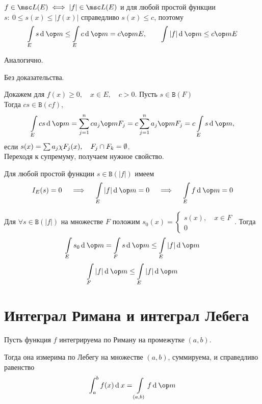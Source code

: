 \begin{eproof}
	\item $ f \in \msc L(E) \iff |f| \in \msc L(E) $ и для любой простой функции $ s : ~ 0 \le s(x) \le |f(x)| $ справедливо $ s(x) \le c $, поэтому
	$$ \int\limits_E s \di \op m \le \int\limits_E c \di \op m = c \op m E, \qquad \int |f| \di \op m \le c \op m E $$

	\item Аналогично.

	\item Без доказательства.

	\item Докажем для $ f(x) \ge 0, \quad x \in E, \quad c > 0 $.
		Пусть $ s \in \mathtt B(F) $ \\
	Тогда $ cs \in \mathtt B(cf) $,
	$$ \int\limits_{E} cs \di \op m = \sum_{j = 1}^n ca_j \op m F_j = c \sum_{j = 1}^n a_j \op m F_j = c \int\limits_E s \di \op m, $$
	если $ s(x) = \sum a_j \chi{F_j}(x), \quad F_j \cap F_k = \emptyset $. \\
	Переходя к супремуму, получаем нужное свойство.

	\item Для любой простой функции $ s \in \mathtt B(|f|) $ имеем
		$$ I_E(s) = 0 \quad \implies \quad \int\limits_E |f| \di \op m = 0 \quad \implies \quad \int\limits_E f \di \op m = 0 $$

	\item Для $ \forall s \in \mathtt B(|f|) $ на множестве $ F $ положим $ s_0(x) =
		\begin{cases}
			s(x), \quad x \in F \\
			0
		\end{cases} $. Тогда
		$$ \int\limits_E s_0 \di \op m = \int\limits_F s \di \op m \le \int \limits_E |f| \di \op m $$
		$$ \int\limits_F |f| \di \op m \le \int\limits_E |f| \di \op m $$
\end{eproof}

\section{Интеграл Римана и интеграл Лебега}

\begin{theorem}
	Пусть функция $ f $ интегрируема по Риману на промежутке $ (a, b) $.

	Тогда она измерима по Лебегу на множестве $ (a, b) $, суммируема, и справедливо равенство
	$$ \int_a^b f(x) \di x = \int\limits_{(a, b)} f \di \op m $$
\end{theorem}

